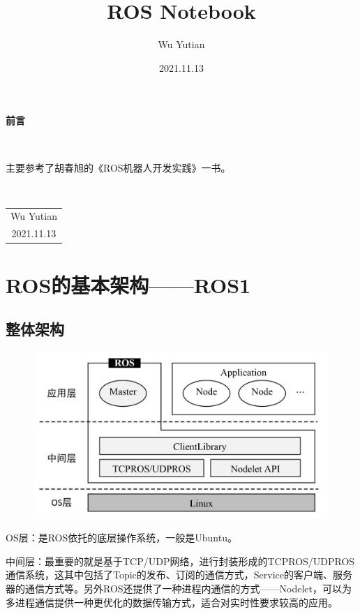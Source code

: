 \documentclass[10pt, oneside]{book}
\title{\Huge{\textbf{ROS Notebook}}}
\author{Wu Yutian}
\date{2021.11.13}
\begin{document}
\maketitle

\setcounter{page}{1}

\begin{center}
    \Huge\textbf{前言}
\end{center}~\

主要参考了胡春旭的《ROS机器人开发实践》一书。

~\\
\begin{flushright}     
    \begin{tabular}{c}
        Wu Yutian\\
        2021.11.13
    \end{tabular}
\end{flushright}

\newpage
{}
\setcounter{page}{1}
\tableofcontents
\newpage
\setcounter{page}{1}

\chapter{ROS的基本架构——ROS1}

\section{整体架构}

\begin{figure}[H]
    \centering
    \includegraphics[width=0.6\linewidth]{image/ROS1架构.jpg}
\end{figure}

OS层：是ROS依托的底层操作系统，一般是Ubuntu。

中间层：最重要的就是基于TCP/UDP网络，进行封装形成的TCPROS/UDPROS通信系统，这其中包括了Topic的发布、订阅的通信方式，Service的客户端、服务器的通信方式等。另外ROS还提供了一种进程内通信的方式——Nodelet，可以为多进程通信提供一种更优化的数据传输方式，适合对实时性要求较高的应用。
\end{document}
